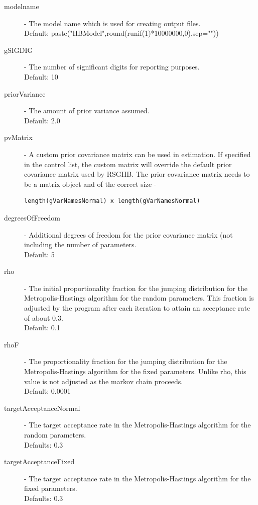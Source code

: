 \documentclass{article}
\begin{document}
\begin{description}
\item[modelname] - The model name which is used for creating output files. 
\\ Default: paste("HBModel",round(runif(1)*10000000,0),sep=""))

\item[gSIGDIG] - The number of significant digits for reporting purposes.\\ 
Default: 10

\item[priorVariance] - The amount of prior variance assumed.\\ 
Default: 2.0

\item[pvMatrix] - A custom prior covariance matrix can be used in estimation. If specified in the control list, the custom matrix will override the default prior covariance matrix used by RSGHB. The prior covariance matrix needs to be a matrix object and of the correct size - \begin{verbatim}length(gVarNamesNormal) x length(gVarNamesNormal)\end{verbatim}  

\item[degreesOfFreedom] - Additional degrees of freedom for the prior covariance matrix (not including the number of parameters.\\ 
Default: 5

\item[rho] - The initial proportionality fraction for the jumping distribution for the Metropolis-Hastings algorithm for the random parameters. This fraction is adjusted by the program after each iteration to attain an acceptance rate of about 0.3.\\ 
Default: 0.1

\item[rhoF] - The proportionality fraction for the jumping distribution for the Metropolis-Hastings algorithm for the fixed parameters. Unlike rho, this value is not adjusted as the markov chain proceeds. \\
Default: 0.0001

\item[targetAcceptanceNormal] - The target acceptance rate in the Metropolis-Hastings algorithm for the random parameters. \\
Defaults: 0.3

\item[targetAcceptanceFixed] - The target acceptance rate in the Metropolis-Hastings algorithm for the fixed parameters. \\
Defaults: 0.3


\end{description}
\end{document}
